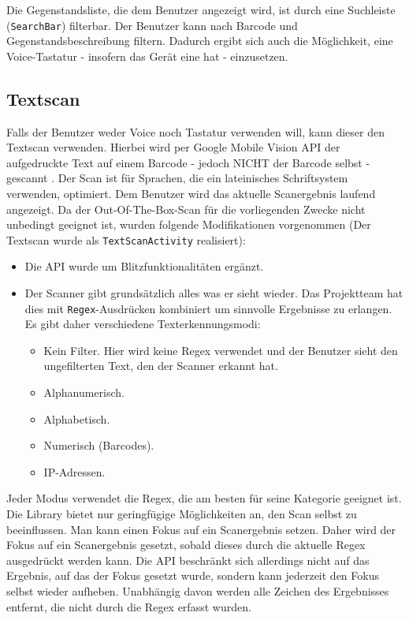 Die Gegenstandsliste, die dem Benutzer angezeigt wird, ist durch eine
Suchleiste (\texttt{SearchBar}) filterbar. Der Benutzer kann nach
Barcode und Gegenstandsbeschreibung filtern. Dadurch ergibt sich auch
die Möglichkeit, eine Voice-Tastatur - insofern das Gerät eine hat -
einzusetzen.

\hypertarget{textscan}{%
\subsection{Textscan}\label{textscan}}

Falls der Benutzer weder Voice noch Tastatur verwenden will, kann dieser
den Textscan verwenden. Hierbei wird per Google Mobile Vision API der
aufgedruckte Text auf einem Barcode - jedoch NICHT der Barcode selbst -
gescannt \cite{text-scan}. Der Scan ist für Sprachen, die ein
lateinisches Schriftsystem verwenden, optimiert. Dem Benutzer wird das
aktuelle Scanergebnis laufend angezeigt. Da der Out-Of-The-Box-Scan für
die vorliegenden Zwecke nicht unbedingt geeignet ist, wurden folgende
Modifikationen vorgenommen (Der Textscan wurde als
\texttt{TextScanActivity} realisiert):

\begin{itemize}
\tightlist
\item
  Die API wurde um Blitzfunktionalitäten ergänzt.
\item
  Der Scanner gibt grundsätzlich alles was er sieht wieder. Das
  Projektteam hat dies mit \texttt{Regex}-Ausdrücken kombiniert um
  sinnvolle Ergebnisse zu erlangen. Es gibt daher verschiedene
  Texterkennungsmodi:

  \begin{itemize}
  \tightlist
  \item
    Kein Filter. Hier wird keine Regex verwendet und der Benutzer sieht
    den ungefilterten Text, den der Scanner erkannt hat.
  \item
    Alphanumerisch.
  \item
    Alphabetisch.
  \item
    Numerisch (Barcodes).
  \item
    IP-Adressen.
  \end{itemize}
\end{itemize}

Jeder Modus verwendet die Regex, die am besten für seine Kategorie
geeignet ist. Die Library bietet nur geringfügige Möglichkeiten an, den
Scan selbst zu beeinflussen. Man kann einen Fokus auf ein Scanergebnis
setzen. Daher wird der Fokus auf ein Scanergebnis gesetzt, sobald dieses
durch die aktuelle Regex ausgedrückt werden kann. Die API beschränkt
sich allerdings nicht auf das Ergebnis, auf das der Fokus gesetzt wurde,
sondern kann jederzeit den Fokus selbst wieder aufheben. Unabhängig
davon werden alle Zeichen des Ergebnisses entfernt, die nicht durch die
Regex erfasst wurden.

